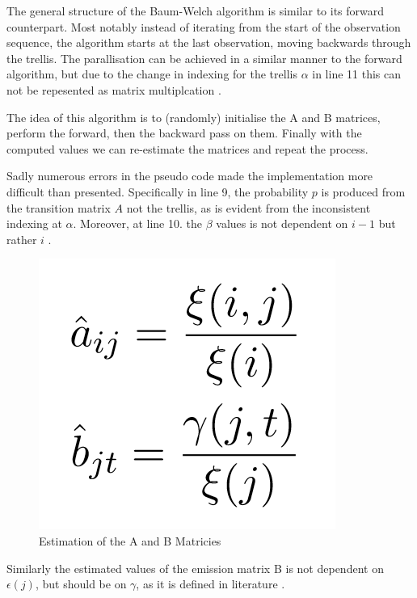 \documentclass[english, paper=a4]{scrartcl}
\begin{document}
The general structure of the Baum-Welch algorithm is similar to its forward counterpart. Most notably instead of iterating from the start of the observation sequence, the algorithm starts at the last observation, moving backwards through the trellis. The parallisation can be achieved in a similar manner to the forward algorithm, but due to the change in indexing for the trellis \(\alpha\) in line 11 this can not be repesented as matrix multiplcation \cite{cuhmm}.

The idea of this algorithm is to (randomly) initialise the A and B matrices, perform the forward, then the backward pass on them. Finally with the computed values we can re-estimate the matrices and repeat the process.

Sadly numerous errors in the pseudo code made the implementation more difficult than presented. Specifically in line 9, the probability \(p\) is produced from the transition matrix \(A\) not the trellis, as is evident from the inconsistent indexing at \(\alpha\). Moreover, at line 10. the \(\beta\) values is not dependent on \(i-1\) but rather \(i\) \cite{hmm}. 

\begin{figure}[H]

\centering
\includegraphics[scale=0.4]{"estimation"}
 \caption{Estimation of the A and B Matricies \cite{cuhmm}}

\end{figure}

Similarly the estimated values of the emission matrix B is not dependent on \(\epsilon(j)\), but should be on \(\gamma\), as it is defined in literature \cite{hmm}. 

\newpage
\end{document}

